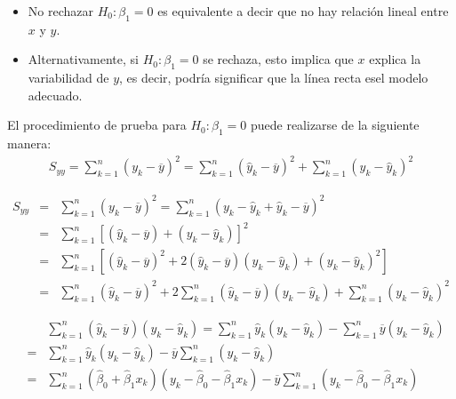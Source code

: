 \begin{itemize}
\item No rechazar $H_{0}:\beta_{1}=0$ es equivalente a decir que no hay relaci\'on lineal entre $x$ y $y$.
\item Alternativamente, si $H_{0}:\beta_{1}=0$ se rechaza, esto implica que $x$ explica la variabilidad de $y$, es decir, podr\'ia significar que la l\'inea recta esel modelo adecuado.
\end{itemize}
El procedimiento de prueba para $H_{0}:\beta_{1}=0$ puede realizarse de la siguiente manera:
\begin{eqnarray*}
S_{yy}=\sum_{k=1}^{n}\left(y_{k}-\overline{y}\right)^{2}=\sum_{k=1}^{n}\left(\hat{y}_{k}-\overline{y}\right)^{2}+\sum_{k=1}^{n}\left(y_{k}-\hat{y}_{k}\right)^{2}
\end{eqnarray*}

\begin{eqnarray*}
S_{yy}&=&\sum_{k=1}^{n}\left(y_{k}-\overline{y}\right)^{2}=\sum_{k=1}^{n}\left(y_{k}-\hat{y}_{k}+\hat{y}_{k}-\overline{y}\right)^{2}\\
&=&\sum_{k=1}^{n}\left[\left(\hat{y}_{k}-\overline{y}\right)+\left(y_{k}-\hat{y}_{k}\right)\right]^{2}\\
&=&\sum_{k=1}^{n}\left[\left(\hat{y}_{k}-\overline{y}\right)^{2}+2\left(\hat{y}_{k}-\overline{y}\right)\left(y_{k}-\hat{y}_{k}\right)+\left(y_{k}-\hat{y}_{k}\right)^{2}\right]\\
&=&\sum_{k=1}^{n}\left(\hat{y}_{k}-\overline{y}\right)^{2}+2\sum_{k=1}^{n}\left(\hat{y}_{k}-\overline{y}\right)\left(y_{k}-\hat{y}_{k}\right)+\sum_{k=1}^{n}\left(y_{k}-\hat{y}_{k}\right)^{2}
\end{eqnarray*}






\begin{eqnarray*}
&&\sum_{k=1}^{n}\left(\hat{y}_{k}-\overline{y}\right)\left(y_{k}-\hat{y}_{k}\right)=\sum_{k=1}^{n}\hat{y}_{k}\left(y_{k}-\hat{y}_{k}\right)-\sum_{k=1}^{n}\overline{y}\left(y_{k}-\hat{y}_{k}\right)\\
&=&\sum_{k=1}^{n}\hat{y}_{k}\left(y_{k}-\hat{y}_{k}\right)-\overline{y}\sum_{k=1}^{n}\left(y_{k}-\hat{y}_{k}\right)\\
&=&\sum_{k=1}^{n}\left(\hat{\beta}_{0}+\hat{\beta}_{1}x_{k}\right)\left(y_{k}-\hat{\beta}_{0}-\hat{\beta}_{1}x_{k}\right)-\overline{y}\sum_{k=1}^{n}\left(y_{k}-\hat{\beta}_{0}-\hat{\beta}_{1}x_{k}\right)
\end{eqnarray*}

